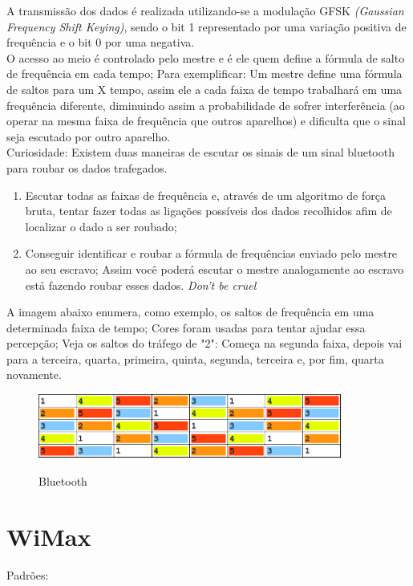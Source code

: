 \documentclass{article}
\begin{document}
A transmissão dos dados é realizada utilizando-se a modulação GFSK \textit{(Gaussian
Frequency Shift Keying)}, sendo o bit 1 representado por uma variação positiva
de frequência e o bit 0 por uma negativa.\\
O acesso ao meio é controlado pelo mestre e é ele quem define a fórmula de salto
de frequência em cada tempo; Para exemplificar: Um mestre define uma fórmula de
saltos para um X tempo, assim ele a cada faixa de tempo trabalhará em uma
frequência diferente, diminuindo assim a probabilidade de sofrer interferência
(ao operar na mesma faixa de frequência que outros aparelhos) e dificulta que o
sinal seja escutado por outro aparelho.\\
Curiosidade: Existem duas maneiras de escutar os sinais de um sinal bluetooth
para roubar os dados trafegados.
\begin{enumerate}
	\item Escutar todas as faixas de frequência e, através de um
algoritmo de força bruta, tentar fazer todas as ligações possíveis dos dados
recolhidos afim de localizar o dado a ser roubado;
	\item Conseguir identificar e roubar a fórmula de frequências enviado pelo mestre ao
seu escravo; Assim você poderá escutar o mestre analogamente ao escravo está
fazendo roubar esses dados. \textit{Don't be cruel}
\end{enumerate}

A imagem abaixo enumera, como exemplo, os saltos de frequência em uma
determinada faixa de tempo; Cores foram usadas para tentar ajudar essa
percepção; Veja os saltos do tráfego de "2": Começa na segunda faixa, depois vai
para a terceira, quarta, primeira, quinta, segunda, terceira e, por fim, quarta
novamente.

\begin{figure}[h]
    \center
    \includegraphics[width=10cm]{imagens/bluetooth.png}
   \label{bluetooth}
    \caption{Bluetooth}
\end{figure}

\section{WiMax}

Padrões:
\end{document}
